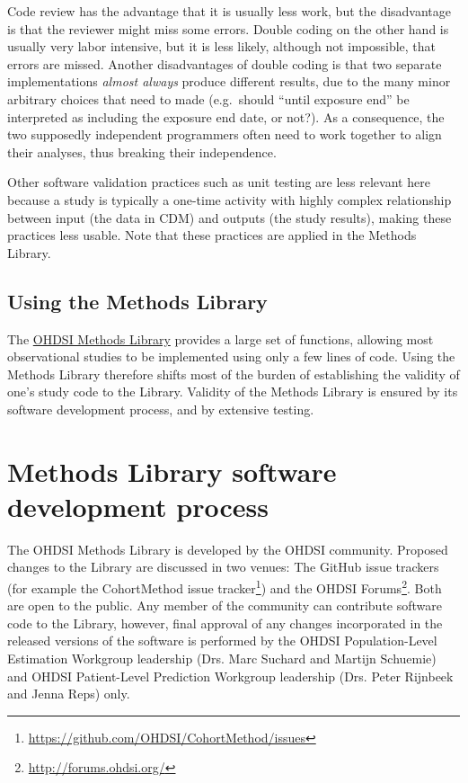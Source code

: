 \documentclass[11pt]{book}
\let\rmarkdownfootnote\footnote%
\def\footnote{\protect\rmarkdownfootnote}
\theoremstyle{definition}
\theoremstyle{definition}
\theoremstyle{definition}
\theoremstyle{remark}
\begin{document}
Code review has the advantage that it is usually less work, but the disadvantage is that the reviewer might miss some errors. Double coding on the other hand is usually very labor intensive, but it is less likely, although not impossible, that errors are missed. Another disadvantages of double coding is that two separate implementations \emph{almost always} produce different results, due to the many minor arbitrary choices that need to made (e.g.~should ``until exposure end'' be interpreted as including the exposure end date, or not?). As a consequence, the two supposedly independent programmers often need to work together to align their analyses, thus breaking their independence.

Other software validation practices such as unit testing are less relevant here because a study is typically a one-time activity with highly complex relationship between input (the data in CDM) and outputs (the study results), making these practices less usable. Note that these practices are applied in the Methods Library.

\hypertarget{using-the-methods-library}{%
\subsection{Using the Methods Library}\label{using-the-methods-library}}

The \href{https://ohdsi.github.io/MethodsLibrary/}{OHDSI Methods Library} provides a large set of functions, allowing most observational studies to be implemented using only a few lines of code. Using the Methods Library therefore shifts most of the burden of establishing the validity of one's study code to the Library. Validity of the Methods Library is ensured by its software development process, and by extensive testing.

\hypertarget{methods-library-software-development-process}{%
\section{Methods Library software development process}\label{methods-library-software-development-process}}

The OHDSI Methods Library is developed by the OHDSI community. Proposed changes to the Library are discussed in two venues: The GitHub issue trackers (for example the CohortMethod issue tracker\footnote{\url{https://github.com/OHDSI/CohortMethod/issues}}) and the OHDSI Forums\footnote{\url{http://forums.ohdsi.org/}}. Both are open to the public. Any member of the community can contribute software code to the Library, however, final approval of any changes incorporated in the released versions of the software is performed by the OHDSI Population-Level Estimation Workgroup leadership (Drs. Marc Suchard and Martijn Schuemie) and OHDSI Patient-Level Prediction Workgroup leadership (Drs. Peter Rijnbeek and Jenna Reps) only.
\end{document}
